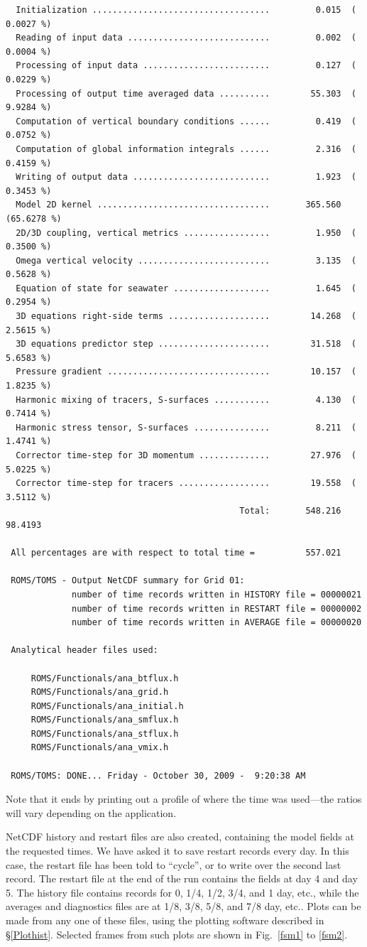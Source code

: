 \begin{verbatim}
  Initialization ...................................         0.015  ( 0.0027 %)
  Reading of input data ............................         0.002  ( 0.0004 %)
  Processing of input data .........................         0.127  ( 0.0229 %)
  Processing of output time averaged data ..........        55.303  ( 9.9284 %)
  Computation of vertical boundary conditions ......         0.419  ( 0.0752 %)
  Computation of global information integrals ......         2.316  ( 0.4159 %)
  Writing of output data ...........................         1.923  ( 0.3453 %)
  Model 2D kernel ..................................       365.560  (65.6278 %)
  2D/3D coupling, vertical metrics .................         1.950  ( 0.3500 %)
  Omega vertical velocity ..........................         3.135  ( 0.5628 %)
  Equation of state for seawater ...................         1.645  ( 0.2954 %)
  3D equations right-side terms ....................        14.268  ( 2.5615 %)
  3D equations predictor step ......................        31.518  ( 5.6583 %)
  Pressure gradient ................................        10.157  ( 1.8235 %)
  Harmonic mixing of tracers, S-surfaces ...........         4.130  ( 0.7414 %)
  Harmonic stress tensor, S-surfaces ...............         8.211  ( 1.4741 %)
  Corrector time-step for 3D momentum ..............        27.976  ( 5.0225 %)
  Corrector time-step for tracers ..................        19.558  ( 3.5112 %)
                                              Total:       548.216   98.4193

 All percentages are with respect to total time =          557.021

 ROMS/TOMS - Output NetCDF summary for Grid 01:
             number of time records written in HISTORY file = 00000021
             number of time records written in RESTART file = 00000002
             number of time records written in AVERAGE file = 00000020

 Analytical header files used:

     ROMS/Functionals/ana_btflux.h
     ROMS/Functionals/ana_grid.h
     ROMS/Functionals/ana_initial.h
     ROMS/Functionals/ana_smflux.h
     ROMS/Functionals/ana_stflux.h
     ROMS/Functionals/ana_vmix.h

 ROMS/TOMS: DONE... Friday - October 30, 2009 -  9:20:38 AM
\end{verbatim}
Note that it ends by printing out a profile of where the time was
used---the ratios will vary depending on the application.

NetCDF history and restart files are also created, containing
the model fields at the requested times. We have asked it to save 
restart records every day. In this case, the restart
file has been told to ``cycle'', or to write over the second last
record. The restart file at the end of the run contains the fields at
day 4 and day 5. The history file contains records for 0, 1/4, 1/2,
3/4, and 1 day, etc., while the averages and diagnostics files are
at 1/8, 3/8, 5/8, and 7/8 day, etc..
Plots can be made from any one of these files, using the plotting
software described in \S\ref{Plothist}.  Selected frames from
such plots are shown in Fig.\ \ref{fsm1} to \ref{fsm2}.

